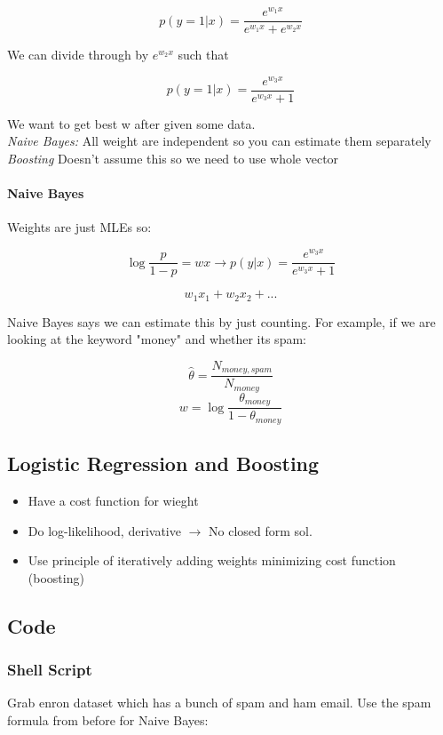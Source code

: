 $$p(y=1|x) = \frac{e^{w_1x}}{e^{w_1x}+e^{w_2x}}$$

We can divide through by $e^{w_2x}$ such that

$$p(y=1|x) = \frac{e^{w_3x}}{e^{w_3x}+1}$$

We want to get best w after given some data.\\
\textit{Naive Bayes:} All weight are independent so you can estimate them separately\\
\textit{Boosting} Doesn't assume this so we need to use whole vector

\paragraph{Naive Bayes\\}

Weights are just MLEs so:

$$\log{\frac{p}{1-p}} = wx \rightarrow p(y|x) = \frac{e^{w_3x}}{e^{w_3x}+1}$$

$$w_1x_1+w_2x_2+...$$

Naive Bayes says we can estimate this by just counting. For example, if we are looking at the keyword "money" and whether its spam:

$$\hat{\theta} = \frac{N_{money, spam}}{N_{money}}$$
$$w = \log{\frac{\theta_{money}}{1-\theta_{money}}}$$ 

\subsection{Logistic Regression and Boosting}

\begin{itemize}
	\item Have a cost function for wieght
	\item Do log-likelihood, derivative $\rightarrow$ No closed form sol.
	\item Use principle of iteratively adding weights minimizing cost function (boosting)
\end{itemize}

\subsection{Code}
\subsubsection{Shell Script}

Grab enron dataset which has a bunch of spam and ham email. Use the spam formula from before for Naive Bayes:

